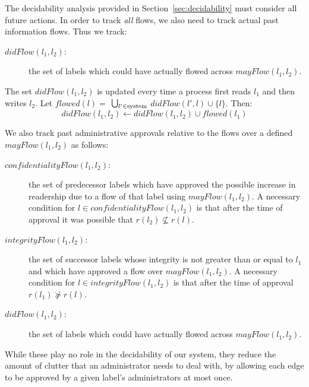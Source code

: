 \documentclass[11pt]{article}
\begin{document}
The decidability analysis provided in Section~\ref{sec:decidability}
must consider all future actions.
In order to track \emph{all} flows, we also need to track actual past
information flows.
Thus we track:
\begin{description}
\item[$didFlow(l_1,l_2)$:] the set of labels which could have
  actually flowed across $mayFlow(l_1,l_2)$.
\end{description}
The set $didFlow(l_1,l_2)$ is updated  every time a process first
reads $l_1$ and then writes $l_2$. 
Let $flowed(l)=$
$ \bigcup_{l' \in \mbox{\scriptsize system}}$
$didFlow(l',l) \cup \{l\}$.
 Then:
\[
    didFlow(l_1,l_2) \leftarrow didFlow(l_1,l_2) \cup flowed(l_1)
\]

We also track past administrative approvals  relative to the
flows over a defined \(mayFlow(l_1,l_2)\) as follows:
\begin{description}
\item[$confidentialityFlow(l_1,l_2)$:] the set of predecessor labels
  which have approved the possible increase in readership due to a flow of that
  label using $mayFlow(l_1,l_2)$.
  A necessary condition for $l\in confidentialityFlow(l_1,l_2)$
  is that after the time of approval it was possible that
  $r(l_2) \not\subseteq r(l)$.
\item[$integrityFlow(l_1,l_2)$:] the set of successor labels
  whose integrity is not greater than or equal to $l_1$
  and which have approved a flow over $mayFlow(l_1,l_2)$.
  A necessary condition for $l \in integrityFlow(l_1,l_2)$
  is that after the time of approval $r(l_1) \not\succeq r(l)$.
\item[$didFlow(l_1,l_2)$:] the set of labels which could have
  actually flowed across $mayFlow(l_1,l_2)$.
\end{description}
While these play no role in the decidability of
our system, they reduce the amount of clutter that
an administrator needs to deal with, by allowing
 each edge to be  approved by a given label's administrators
at most once.
\end{document}
